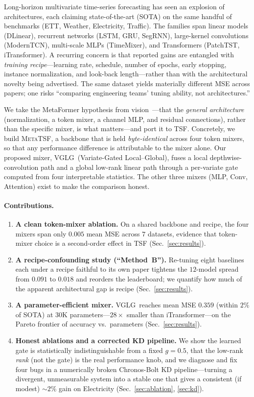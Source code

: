 \documentclass[11pt]{article}
\newcommand{\mtsf}{\textsc{MetaTSF}}
\newcommand{\vglg}{\textsc{VGLG}}
\begin{document}
Long-horizon multivariate time-series forecasting has seen an explosion of
architectures, each claiming state-of-the-art (SOTA) on the same handful of
benchmarks (ETT, Weather, Electricity, Traffic). The families span linear models
(DLinear), recurrent networks (LSTM, GRU, SegRNN), large-kernel convolutions
(ModernTCN), multi-scale MLPs (TimeMixer), and Transformers (PatchTST,
iTransformer). A recurring concern is that reported gains are entangled with
\emph{training recipe}---learning rate, schedule, number of epochs, early
stopping, instance normalization, and look-back length---rather than with the
architectural novelty being advertised. The same dataset yields materially
different MSE across papers; one risks ``comparing engineering teams' tuning
ability, not architectures.''

We take the MetaFormer hypothesis from vision~\cite{metaformer}---that the
\emph{general architecture} (normalization, a token mixer, a channel MLP, and
residual connections), rather than the specific mixer, is what matters---and port
it to TSF. Concretely, we build \mtsf, a backbone that is held \emph{byte-identical}
across four token mixers, so that any performance difference is attributable to
the mixer alone. Our proposed mixer, \vglg\ (Variate-Gated Local--Global), fuses a
local depthwise-convolution path and a global low-rank linear path through a
per-variate gate computed from four interpretable statistics. The other three
mixers (MLP, Conv, Attention) exist to make the comparison honest.

\paragraph{Contributions.}
\begin{enumerate}[leftmargin=1.4em,itemsep=2pt]
\item \textbf{A clean token-mixer ablation.} On a shared backbone and recipe, the
four mixers span only $0.005$ mean MSE across $7$ datasets, evidence that
token-mixer choice is a second-order effect in TSF (Sec.~\ref{sec:results}).
\item \textbf{A recipe-confounding study (``Method~B'').} Re-tuning eight
baselines each under a recipe faithful to its own paper tightens the $12$-model
spread from $0.091$ to $0.018$ and reorders the leaderboard; we quantify how much
of the apparent architectural gap is recipe (Sec.~\ref{sec:results}).
\item \textbf{A parameter-efficient mixer.} \vglg\ reaches mean MSE $0.359$
(within $2\%$ of SOTA) at $30$K parameters---$28\times$ smaller than
iTransformer---on the Pareto frontier of accuracy vs.\ parameters (Sec.~\ref{sec:results}).
\item \textbf{Honest ablations and a corrected KD pipeline.} We show the learned
gate is statistically indistinguishable from a fixed $g{=}0.5$, that the low-rank
\emph{rank} (not the gate) is the real performance knob, and we diagnose and fix
four bugs in a numerically broken Chronos-Bolt KD pipeline---turning a divergent,
unmeasurable system into a stable one that gives a consistent (if modest)
$\sim\!2\%$ gain on Electricity (Sec.~\ref{sec:ablation}, \ref{sec:kd}).
\end{enumerate}
\end{document}

